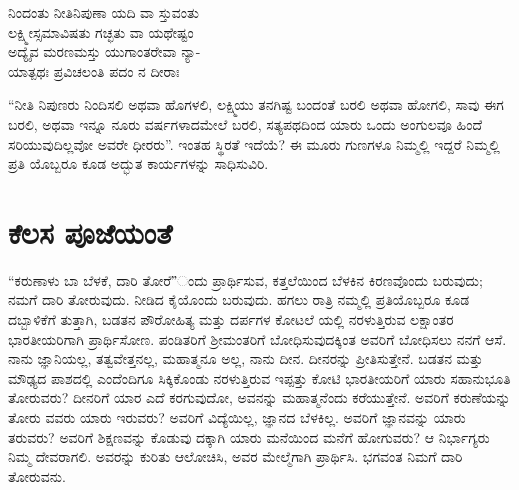 \begin{myquote}
ನಿಂದಂತು ನೀತಿನಿಪುಣಾ ಯದಿ ವಾ ಸ್ತುವಂತು\\ಲಕ್ಷ್ಮೀಸ್ಸಮಾವಿಷತು ಗಚ್ಛತು ವಾ ಯಥೇಷ್ಟಂ\\ಅದ್ಯೈವ ಮರಣಮಸ್ತು ಯುಗಾಂತರೇವಾ ನ್ಯಾ-\\ಯಾತ್ಪಥಃ ಪ್ರವಿಚಲಂತಿ ಪದಂ ನ ದೀರಾಃ
\end{myquote}

“ನೀತಿ ನಿಪುಣರು ನಿಂದಿಸಲಿ ಅಥವಾ ಹೊಗಳಲಿ, ಲಕ್ಷ್ಮಿಯು ತನಗಿಷ್ಟ ಬಂದಂತೆ ಬರಲಿ ಅಥವಾ ಹೋಗಲಿ, ಸಾವು ಈಗ ಬರಲಿ, ಅಥವಾ ಇನ್ನೂ ನೂರು ವರ್ಷಗಳಾದಮೇಲೆ ಬರಲಿ, ಸತ್ಯಪಥದಿಂದ ಯಾರು ಒಂದು ಅಂಗುಲವೂ ಹಿಂದೆ ಸರಿಯುವುದಿಲ್ಲವೋ ಅವರೇ ಧೀರರು”. ಇಂತಹ ಸ್ಥಿರತೆ ಇದೆಯೆ? ಈ ಮೂರು ಗುಣಗಳೂ ನಿಮ್ಮಲ್ಲಿ ಇದ್ದರೆ ನಿಮ್ಮಲ್ಲಿ ಪ್ರತಿ ಯೊಬ್ಬರೂ ಕೂಡ ಅದ್ಭುತ ಕಾರ್ಯಗಳನ್ನು ಸಾಧಿಸುವಿರಿ.


\section{ಕೆಲಸ ಪೂಜೆಯಂತೆ}

“ಕರುಣಾಳು ಬಾ ಬೆಳಕೆ, ದಾರಿ ತೋರೆ”ಂದು ಪ್ರಾರ್ಥಿಸುವ, ಕತ್ತಲೆಯಿಂದ ಬೆಳಕಿನ ಕಿರಣವೊಂದು ಬರುವುದು; ನಮಗೆ ದಾರಿ ತೋರುವುದು. ನೀಡಿದ ಕೈಯೊಂದು ಬರುವುದು. ಹಗಲು ರಾತ್ರಿ ನಮ್ಮಲ್ಲಿ ಪ್ರತಿಯೊಬ್ಬರೂ ಕೂಡ ದಬ್ಬಾಳಿಕೆಗೆ ತುತ್ತಾಗಿ, ಬಡತನ ಪೌರೋಹಿತ್ಯ ಮತ್ತು ದರ್ಪಗಳ ಕೋಟಲೆ ಯಲ್ಲಿ ನರಳುತ್ತಿರುವ ಲಕ್ಷಾಂತರ ಭಾರತೀಯರಿಗಾಗಿ ಪ್ರಾರ್ಥಿಸೋಣ. ಪಂಡಿತರಿಗೆ ಶ್ರೀಮಂತರಿಗೆ ಬೋಧಿಸುವುದಕ್ಕಿಂತ ಅವರಿಗೆ ಬೋಧಿಸಲು ನನಗೆ ಆಸೆ. ನಾನು ಜ್ಞಾನಿಯಲ್ಲ, ತತ್ವವೇತ್ತನಲ್ಲ, ಮಹಾತ್ಮನೂ ಅಲ್ಲ, ನಾನು ದೀನ. ದೀನರನ್ನು ಪ್ರೀತಿಸುತ್ತೇನೆ. ಬಡತನ ಮತ್ತು ಮೌಢ್ಯದ ಪಾಶದಲ್ಲಿ ಎಂದೆಂದಿಗೂ ಸಿಕ್ಕಿಕೊಂಡು ನರಳುತ್ತಿರುವ ಇಪ್ಪತ್ತು ಕೋಟಿ ಭಾರತೀಯರಿಗೆ ಯಾರು ಸಹಾನುಭೂತಿ ತೋರುವರು? ದೀನರಿಗೆ ಯಾರ ಎದೆ ಕರಗುವುದೋ, ಅವನನ್ನು ಮಹಾತ್ಮನೆಂದು ಕರೆಯುತ್ತೇನೆ. ಅವರಿಗೆ ಕರುಣೆಯನ್ನು ತೋರು ವವರು ಯಾರು ಇರುವರು? ಅವರಿಗೆ ವಿದ್ಯೆಯಿಲ್ಲ, ಜ್ಞಾನದ ಬೆಳಕಿಲ್ಲ. ಅವರಿಗೆ ಜ್ಞಾನವನ್ನು ಯಾರು ತರುವರು? ಅವರಿಗೆ ಶಿಕ್ಷಣವನ್ನು ಕೊಡುವು ದಕ್ಕಾಗಿ ಯಾರು ಮನೆಯಿಂದ ಮನೆಗೆ ಹೋಗುವರು? ಆ ನಿರ್ಭಾಗ್ಯರು ನಿಮ್ಮ ದೇವರಾಗಲಿ. ಅವರನ್ನು ಕುರಿತು ಆಲೋಚಿಸಿ, ಅವರ ಮೇಲ್ಮೆಗಾಗಿ ಪ್ರಾರ್ಥಿಸಿ. ಭಗವಂತ ನಿಮಗೆ ದಾರಿ ತೋರುವನು.

